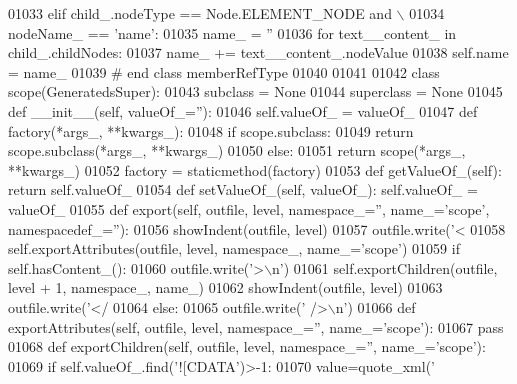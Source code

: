 \begin{DoxyCode}
{{{{{{{{{{{{{{{{{{{{{{{{{{{{{{{{{{{{{{{{{{{{{{{{{{{01033         \textcolor{keywordflow}{elif} child\_.nodeType == Node.ELEMENT\_NODE \textcolor{keywordflow}{and} \(\backslash\)
01034             nodeName\_ == \textcolor{stringliteral}{'name'}:
01035             name\_ = \textcolor{stringliteral}{''}
01036             \textcolor{keywordflow}{for} text\_\_content\_ \textcolor{keywordflow}{in} child\_.childNodes:
01037                 name\_ += text\_\_content\_.nodeValue
01038             self.name = name\_
01039 \textcolor{comment}{# end class memberRefType}
01040 
01041 
01042 \textcolor{keyword}{class }scope(GeneratedsSuper):
01043     subclass = \textcolor{keywordtype}{None}
01044     superclass = \textcolor{keywordtype}{None}
01045     \textcolor{keyword}{def }__init__(self, valueOf\_=''):
01046         self.valueOf_ = valueOf\_
01047     \textcolor{keyword}{def }factory(*args\_, **kwargs\_):
01048         \textcolor{keywordflow}{if} scope.subclass:
01049             \textcolor{keywordflow}{return} scope.subclass(*args\_, **kwargs\_)
01050         \textcolor{keywordflow}{else}:
01051             \textcolor{keywordflow}{return} scope(*args\_, **kwargs\_)
01052     factory = staticmethod(factory)
01053     \textcolor{keyword}{def }getValueOf_(self): \textcolor{keywordflow}{return} self.valueOf\_
01054     \textcolor{keyword}{def }setValueOf_(self, valueOf\_): self.valueOf\_ = valueOf\_
01055     \textcolor{keyword}{def }export(self, outfile, level, namespace\_='', name\_='scope', namespacedef\_=''):
01056         showIndent(outfile, level)
01057         outfile.write(\textcolor{stringliteral}{'<%
01058         self.exportAttributes(outfile, level, namespace\_, name\_=\textcolor{stringliteral}{'scope'})
01059         \textcolor{keywordflow}{if} self.hasContent_():
01060             outfile.write(\textcolor{stringliteral}{'>\(\backslash\)n'})
01061             self.exportChildren(outfile, level + 1, namespace\_, name\_)
01062             showIndent(outfile, level)
01063             outfile.write(\textcolor{stringliteral}{'</%
01064         \textcolor{keywordflow}{else}:
01065             outfile.write(\textcolor{stringliteral}{' />\(\backslash\)n'})
01066     \textcolor{keyword}{def }exportAttributes(self, outfile, level, namespace\_='', name\_='scope'):
01067         \textcolor{keywordflow}{pass}
01068     \textcolor{keyword}{def }exportChildren(self, outfile, level, namespace\_='', name\_='scope'):
01069         \textcolor{keywordflow}{if} self.valueOf\_.find(\textcolor{stringliteral}{'![CDATA'})>-1:
01070             value=quote_xml(\textcolor{stringliteral}{'%
}}}}}}}}}}}}}}}}}}}}}}}}}}}}}}}}}}}}}}}}}}}}}}}}}}}}}}
\end{DoxyCode}
